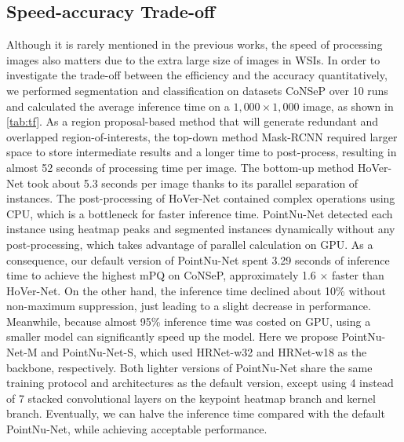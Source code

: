 \documentclass[lettersize,journal]{IEEEtran}
\begin{document}
\subsection{Speed-accuracy Trade-off}
Although it is rarely mentioned in the previous works, the speed of processing images  also matters due to the extra large size of images in WSIs. In order to investigate the trade-off between the efficiency and the accuracy quantitatively, we performed segmentation and classification on datasets CoNSeP over 10 runs and calculated the average inference time on a $1,000 \times 1,000$ image, as shown in \autoref{tab:tf}. As a region proposal-based method that will generate redundant and overlapped region-of-interests, the top-down method Mask-RCNN required larger space to store intermediate results and a longer time to post-process, resulting in almost 52 seconds of processing time per image. The bottom-up method HoVer-Net took about 5.3 seconds per image thanks to its parallel separation of instances. The post-processing of HoVer-Net contained complex operations using CPU, which is a bottleneck for faster inference time. PointNu-Net detected each instance using heatmap peaks and segmented instances dynamically without any post-processing, which takes advantage of parallel calculation on GPU. As a consequence, our default version of PointNu-Net spent 3.29 seconds of inference time to achieve the highest mPQ on CoNSeP, approximately 1.6 $\times$ faster than HoVer-Net. On the other hand, the inference time declined about 10\% without non-maximum suppression, just leading to a slight decrease in performance. Meanwhile, because almost 95\% inference time was costed on GPU, using a smaller model can significantly speed up the model. Here we propose PointNu-Net-M and PointNu-Net-S, which used HRNet-w32 and HRNet-w18 as the backbone, respectively. Both  lighter versions of PointNu-Net share the same training protocol and architectures as the default version, except using 4 instead of 7 stacked convolutional layers on the keypoint heatmap branch and kernel branch. Eventually, we can halve the inference time compared with the default PointNu-Net, while achieving acceptable performance. 
\end{document}

